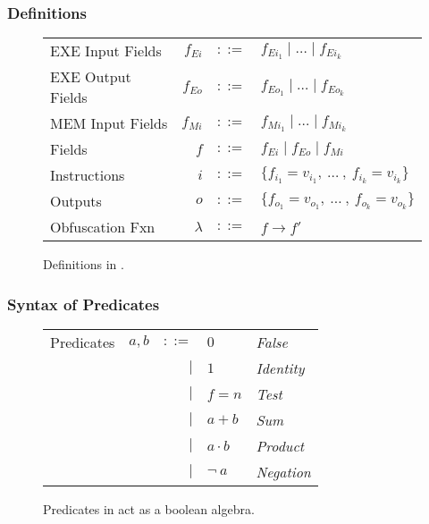 \documentclass[sigconf,usenames,dvipsnames,svgnames,table]{acmart}
\begin{document}
      \subsubsection{Definitions}\label{sec:spec:synt:defn}
        \begin{figure}
          \centering
          \begin{tabular}{l r c l}
            EXE Input Fields  & $f_{Ei}$  & $::=$ & $f_{Ei_{1}} \mid \dots \mid f_{Ei_{k}}$\\
            EXE Output Fields & $f_{Eo}$  & $::=$ & $f_{Eo_{1}} \mid \dots \mid f_{Eo_{k}}$\\
            MEM Input Fields  & $f_{Mi}$  & $::=$ & $f_{Mi_{1}} \mid \dots \mid f_{Mi_{k}}$\\
            Fields            & $f$       & $::=$ & $f_{Ei} \mid f_{Eo} \mid f_{Mi} $ \\
            Instructions      & $i$       & $::=$ & $\{f_{i_{1}} = v_{i_{1}} ,\ \dots\ ,\ f_{i_{k}} = v_{i_{k}}\}$\\
            Outputs           & $o$       & $::=$ & $\{f_{o_{1}} = v_{o_{1}} ,\ \dots\ ,\ f_{o_{k}} = v_{o_{k}}\}$\\
            Obfuscation Fxn   & $\lambda$ & $::=$ & $f \rightarrow f'$
          \end{tabular}
          \caption{Definitions in \sysname.}
          \label{fig:spec:synt:defn}
        \end{figure}

      \subsubsection{Syntax of Predicates}\label{sec:spec:synt:pred}
        \begin{figure}
          \centering
          \begin{tabular}{l c r l l}
            Predicates  & $a,b$ & $::=$  & $0$          & \textit{False}    \\
                        &       & $\mid$ & $1$          & \textit{Identity} \\
                        &       & $\mid$ & $f = n$      & \textit{Test}     \\
                        &       & $\mid$ & $a + b$      & \textit{Sum}      \\
                        &       & $\mid$ & $a \cdot b$  & \textit{Product}  \\
                        &       & $\mid$ & $\neg\ a$    & \textit{Negation}
          \end{tabular}
          \caption{Predicates in \sysname act as a boolean algebra.}
          \label{fig:spec:synt:pred}
        \end{figure}
\end{document}
